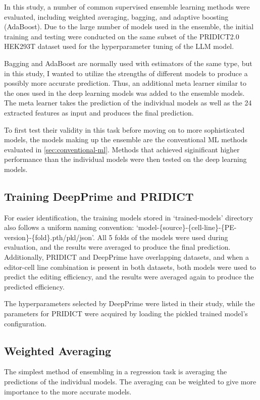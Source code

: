 In this study, a number of common supervised ensemble learning methods were evaluated, including weighted averaging, bagging, and adaptive boosting (AdaBoost). Due to the large number of models used in the ensemble, the initial training and testing were conducted on the same subset of the PRIDICT2.0 HEK293T dataset used for the hyperparameter tuning of the LLM model.

Bagging and  AdaBoost are normally used with estimators of the same type, but in this study, I wanted to utilize the strengths of different models to produce a possibly more accurate prediction. Thus, an additional meta learner similar to the ones used in the deep learning models was added to the ensemble models. The meta learner takes the prediction of the individual models as well as the 24 extracted features as input and produces the final prediction.

To first test their validity in this task before moving on to more sophisticated models, the models making up the ensemble are the conventional ML methods evaluated in \autoref{sec:conventional-ml}. Methods that achieved siginificant higher performance than the individual models were then tested on the deep learning models.

\subsection{Training DeepPrime and PRIDICT}

For easier identification, the training models stored in `trained-models' directory also follows a uniform naming convention: `model-\{source\}-\{cell-line\}-\{PE-version\}-\{fold\}.pth/pkl/json'. All 5 folds of the models were used during evaluation, and the results were averaged to produce the final prediction. Additionally, PRIDICT and DeepPrime have overlapping datasets, and when a editor-cell line combination is present in both datasets, both models were used to predict the editing efficiency, and the results were averaged again to produce the predicted efficiency.

The hyperparameters selected by DeepPrime were listed in their study, while the parameters for PRIDICT were acquired by loading the pickled trained model's configuration. 

\subsection{Weighted Averaging}

The simplest method of ensembling in a regression task is averaging the predictions of the individual models. The averaging can be weighted to give more importance to the more accurate models. 

